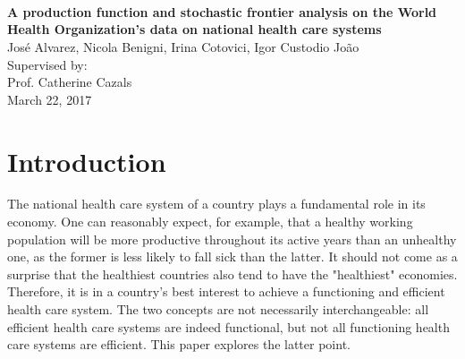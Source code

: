\documentclass[12pt,a4paper]{article}\usepackage[]{graphicx}\usepackage[]{color}
\begin{document}



\vspace{1cm}
\begin{center}
 \\
\vspace{2cm}
 \\
\vspace{1cm}
 \\  %
\vspace{1cm}
\textbf{\Large{A production function and stochastic frontier analysis on the World Health Organization's data on national health care systems}} \\
\vspace{1cm}
Jos\'{e} Alvarez, Nicola Benigni, Irina Cotovici, Igor Custodio Jo\~{a}o \\
\vspace{1cm}
Supervised by: \\
Prof. Catherine Cazals \\
\vspace{1cm}
March 22, 2017
\end{center}

\vfill

\begin{abstract}
\noindent
The abstract goes here...
\end{abstract}

\newpage 
{}
\tableofcontents

\newpage
\section{Introduction}

The national health care system of a country plays a fundamental role in its economy. One can reasonably expect, for example, that a healthy working population will be more productive throughout its active years than an unhealthy one, as the former is less likely to fall sick than the latter. It should not come as a surprise that the healthiest countries also tend to have the "healthiest" economies. Therefore, it is in a country's best interest to achieve a functioning and efficient health care system. The two concepts are not necessarily interchangeable: all efficient health care systems are indeed functional, but not all functioning health care systems are efficient. This paper explores the latter point.
\end{document}
